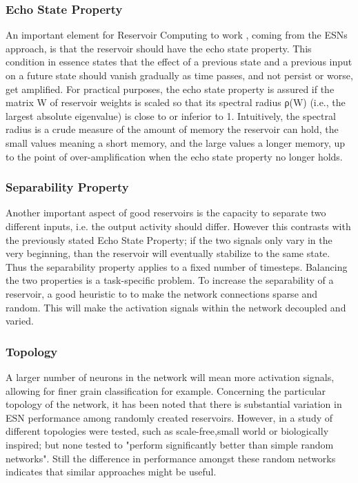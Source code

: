 \documentclass[12pt,oneside]{CUNY_CS_PhD}
\begin{document}
\subsubsection{Echo State Property}
An important element for Reservoir Computing to work , coming from the ESNs approach, is that the reservoir should have the echo state property. This condition in essence states that the effect of a previous state and a previous input on a future state should vanish gradually as time passes, and not persist or worse, get amplified. For practical purposes, the echo state property is assured if the matrix W of reservoir weights is scaled so that its spectral radius ρ(W) (i.e., the largest absolute eigenvalue) is close to or inferior to 1. Intuitively, the spectral radius is a crude measure of the amount of memory the reservoir can hold, the small values meaning a short memory, and the large values a longer memory, up to the point of over-amplification when the echo state property no longer holds.

\subsubsection{Separability Property}
Another important aspect of good reservoirs is the capacity to separate two different inputs, i.e. the output activity should differ. However this contrasts with the previously stated Echo State Property; if the two signals only vary in the very beginning, than the reservoir will eventually stabilize to the same state. Thus the separability property applies to a fixed number of timesteps. Balancing the two properties is a task-specific problem. To increase the separability of a reservoir, a good heuristic to to make the network connections sparse and random. This will  make the activation signals within the network decoupled and varied.

\subsubsection{Topology}
A larger number of neurons in the network will mean more activation signals, allowing for finer grain classification for example. Concerning the particular topology of the network, it has been noted that there is substantial variation in ESN performance among randomly created reservoirs. However, in a study of different topologies were tested, such as scale-free,small world or biologically inspired; but none tested to "perform significantly better than simple random networks". Still the difference in performance amongst these random networks indicates that similar approaches might be useful.
\end{document}
